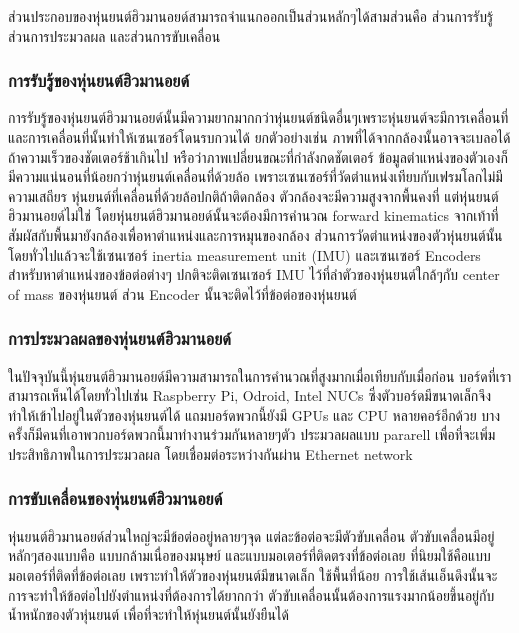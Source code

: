 \clearpage
ส่วนประกอบของหุ่นยนต์ฮิวมานอยด์สามารถจำแนกออกเป็นส่วนหลักๆได้สามส่วนคือ 
ส่วนการรับรู้ ส่วนการประมวลผล และส่วนการขับเคลื่อน

\subsubsection*{การรับรู้ของหุ่นยนต์ฮิวมานอยด์}
การรับรู้ของหุ่นยนต์ฮิวมานอยด์นั้นมีความยากมากกว่าหุ่นยนต์ชนิดอื่นๆเพราะหุ่นยนต์จะมีการเคลื่อนที่ และการเคลื่อนที่นั้นทำให้เซนเซอร์โดนรบกวนได้
ยกตัวอย่างเช่น ภาพที่ได้จากกล้องนั้นอาจจะเบลอได้ถ้าความเร็วของชัตเตอร์ช้าเกินไป หรือว่าภาพเปลี่ยนขณะที่กำลังกดชัตเตอร์
ข้อมูลตำแหน่งของตัวเองก็มีความแน่นอนที่น้อยกว่าหุ่นยนต์เคลื่อนที่ด้วยล้อ เพราะเซนเซอร์ที่วัดตำแหน่งเทียบกับเฟรมโลกไม่มีความเสถียร
หุ่นยนต์ที่เคลื่อนที่ด้วยล้อปกติถ้าติดกล้อง ตัวกล้องจะมีความสูงจากพื้นคงที่ แต่หุ่นยนต์ฮิวมานอยด์ไม่ใช่ โดยหุ่นยนต์ฮิวมานอยด์นั้นจะต้องมีการคำนวณ
forward kinematics จากเท้าที่สัมผัสกับพื้นมายังกล้องเพื่อหาตำแหน่งและการหมุนของกล้อง ส่วนการวัดตำแหน่งของตัวหุ่นยนต์นั้น
โดยทั่วไปแล้วจะใช้เซนเซอร์ inertia measurement unit (IMU) และเซนเซอร์ Encoders สำหรับหาตำแหน่งของข้อต่อต่างๆ
ปกติจะติดเซนเซอร์ IMU ไว้ที่ลำตัวของหุ่นยนต์ใกล้ๆกับ center of mass ของหุ่นยนต์ ส่วน Encoder นั้นจะติดไว้ที่ข้อต่อของหุ่นยนต์

\subsubsection*{การประมวลผลของหุ่นยนต์ฮิวมานอยด์}
ในปัจจุบันนี้หุ่นยนต์ฮิวมานอยด์มีความสามารถในการคำนวณที่สูงมากเมื่อเทียบกับเมื่อก่อน บอร์ดที่เราสามารถเห็นได้โดยทั่วไปเช่น
Raspberry Pi, Odroid, Intel NUCs ซึ่งตัวบอร์ดมีขนาดเล็กจึงทำให้เข้าไปอยู่ในตัวของหุ่นยนต์ได้ แถมบอร์ดพวกนี้ยังมี GPUs
และ CPU หลายคอร์อีกด้วย บางครั้งก็มีคนที่เอาพวกบอร์ดพวกนี้มาทำงานร่วมกันหลายๆตัว ประมวลผลแบบ pararell เพื่อที่จะเพิ่มประสิทธิภาพในการประมวลผล
โดยเชื่อมต่อระหว่างกันผ่าน Ethernet network 

\subsubsection*{การขับเคลื่อนของหุ่นยนต์ฮิวมานอยด์}
หุ่นยนต์ฮิวมานอยด์ส่วนใหญ่จะมีข้อต่ออยู่หลายๆจุด แต่ละข้อต่อจะมีตัวขับเคลื่อน ตัวขับเคลื่อนมีอยู่หลักๆสองแบบคือ
แบบกล้ามเนื่อของมนุษย์ และแบบมอเตอร์ที่ติดตรงที่ข้อต่อเลย ที่นิยมใช้คือแบบมอเตอร์ที่ติดที่ข้อต่อเลย เพราะทำให้ตัวของหุ่นยนต์มีขนาดเล็ก
ใช้พื้นที่น้อย การใช้เส้นเอ็นดึงนั้นจะการจะทำให้ข้อต่อไปยังตำแหน่งที่ต้องการได้ยากกว่า ตัวขับเคลื่อนนั้นต้องการแรงมากน้อยขึ้นอยู่กับ
น้ำหนักของตัวหุ่นยนต์ เพื่อที่จะทำให้หุ่นยนต์นั้นยังยืนได้


